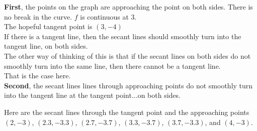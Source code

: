 \documentclass{ximera}
\begin{document}
\textbf{First}, the points on the graph are approaching the point on both sides.  There is no break in the curve. $f$ is continuous at $3$.\\


The hopeful tangent point is $(3, -4)$ \\


If there is a tangent line, then the secant lines should smoothly turn into the tangent line, on both sides.  \\


The other way of thinking of this is that if the secant lines on both sides do not smoothly turn into the same line, then there cannot be a tangent line. \\

That is the case here. \\








\textbf{Second}, the secant lines lines through approaching points do not smoothly turn into the tangent line at the tangent point...on both sides.


Here are the secant lines through the tangent point and the approaching points $(2, -3)$, $(2.3, -3.3)$, $(2.7, -3.7)$, $(3.3, -3.7)$, $(3.7, -3.3)$, and $(4, -3)$.





\begin{image}
\end{image}
\end{document}
